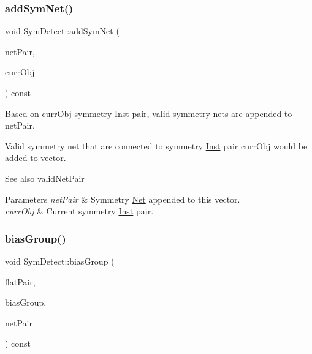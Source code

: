 \subsubsection{\texorpdfstring{add\+Sym\+Net()}{addSymNet()}}
{\footnotesize\ttfamily void Sym\+Detect\+::add\+Sym\+Net (\begin{DoxyParamCaption}\item[{std\+::vector$<$ \hyperlink{classNetPair}{Net\+Pair} $>$ \&}]{net\+Pair,  }\item[{\hyperlink{classMosPair}{Mos\+Pair} \&}]{curr\+Obj }\end{DoxyParamCaption}) const\hspace{0.3cm}{\ttfamily [private]}}



Based on curr\+Obj symmetry \hyperlink{classInst}{Inst} pair, valid symmetry nets are appended to net\+Pair. 

Valid symmetry net that are connected to symmetry \hyperlink{classInst}{Inst} pair curr\+Obj would be added to vector.

\begin{DoxySeeAlso}{See also}
\hyperlink{classSymDetect_a455e5f585e60c484e2d093a44775faf5}{valid\+Net\+Pair} 
\end{DoxySeeAlso}

\begin{DoxyParams}{Parameters}
{\em net\+Pair} & Symmetry \hyperlink{classNet}{Net} appended to this vector. \\
\hline
{\em curr\+Obj} & Current symmetry \hyperlink{classInst}{Inst} pair. \\
\hline
\end{DoxyParams}
\mbox{\label{classSymDetect_a1f9fc68f67c56771e6b9b613b53c821f}} 
\subsubsection{\texorpdfstring{bias\+Group()}{biasGroup()}}
{\footnotesize\ttfamily void Sym\+Detect\+::bias\+Group (\begin{DoxyParamCaption}\item[{std\+::vector$<$ \hyperlink{classMosPair}{Mos\+Pair} $>$ \&}]{flat\+Pair,  }\item[{std\+::vector$<$ \hyperlink{classBias}{Bias} $>$ \&}]{bias\+Group,  }\item[{std\+::vector$<$ \hyperlink{classNetPair}{Net\+Pair} $>$ \&}]{net\+Pair }\end{DoxyParamCaption}) const\hspace{0.3cm}{\ttfamily [private]}}



